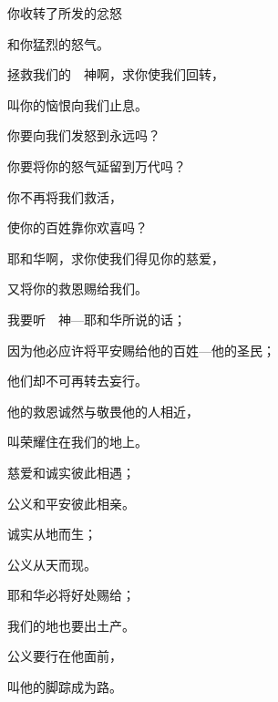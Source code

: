 {\Q {}你收转了所发的忿怒
\par }{\Q 和你猛烈的怒气。
\par }{\BB \par }{\Q {}拯救我们的　神啊，求你使我们回转，
\par }{\Q 叫你的恼恨向我们止息。
\par }{\Q {}你要向我们发怒到永远吗？
\par }{\Q 你要将你的怒气延留到万代吗？
\par }{\Q {}你不再将我们救活，
\par }{\Q 使你的百姓靠你欢喜吗？
\par }{\Q {}耶和华啊，求你使我们得见你的慈爱，
\par }{\Q 又将你的救恩赐给我们。
\par }{\BB \par }{\Q {}我要听　神—耶和华所说的话；
\par }{\Q 因为他必应许将平安赐给他的百姓—他的圣民；
\par }{\Q 他们却不可再转去妄行。
\par }{\Q {}他的救恩诚然与敬畏他的人相近，
\par }{\Q 叫荣耀住在我们的地上。
\par }{\BB \par }{\Q {}慈爱和诚实彼此相遇；
\par }{\Q 公义和平安彼此相亲。
\par }{\Q {}诚实从地而生；
\par }{\Q 公义从天而现。
\par }{\Q {}耶和华必将好处赐给{}；
\par }{\Q 我们的地也要{}出土产。
\par }{\Q {}公义要行在他面前，
\par }{\Q 叫他的脚踪成为{}路。

}
